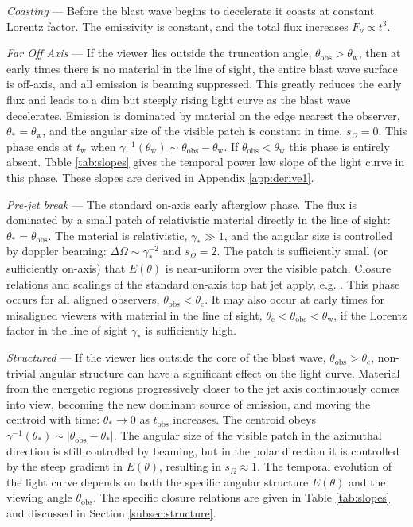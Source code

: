 \documentclass[twocolumn]{aastex62}
\newcommand{\tobs}{\ensuremath{t_{\mathrm{obs}}}}
\newcommand{\tW}{\ensuremath{t_{\mathrm{w}}}}
\newcommand{\thobs}{\ensuremath{\theta_{\mathrm{obs}}}}
\newcommand{\thW}{\ensuremath{\theta_{\mathrm{w}}}}
\newcommand{\thC}{\ensuremath{\theta_{\mathrm{c}}}}
\newcommand{\som}{\ensuremath{s_{\Omega}}}
\begin{document}
\emph{Coasting} --- Before the blast wave begins to decelerate it coasts at constant Lorentz factor. The emissivity is constant, and the total flux increases $F_\nu \propto t^3$.

\emph{Far Off Axis} --- If the viewer lies outside the truncation angle, $\thobs > \thW$, then at early times there is no material in the line of sight, the entire blast wave surface is off-axis, and all emission is beaming suppressed.  This greatly reduces the early flux and leads to a dim but steeply rising light curve as the blast wave decelerates.  Emission is dominated by material on the edge nearest the observer, $\theta_* = \thW$, and the angular size of the visible patch is constant in time, $\som = 0$.  This phase ends at $\tW$ when $\gamma^{-1}(\thW) \sim \thobs-\thW$.  If $\thobs < \thW$ this phase is entirely absent.  Table \ref{tab:slopes} gives the temporal power law slope of the light curve in this phase.  These slopes are derived in Appendix \ref{app:derive1}.

\emph{Pre-jet break} --- The standard on-axis early afterglow phase.  The flux is dominated by a small patch of relativistic material directly in the line of sight: $\theta_* = \thobs$.  The material is relativistic, $\gamma_* \gg 1$, and the angular size is controlled by doppler beaming: $\Delta \Omega \sim \gamma_*^{-2}$ and $\som = 2$.  The patch is sufficiently small (or sufficiently on-axis) that $E(\theta)$ is near-uniform over the visible patch.  Closure relations and scalings of the standard on-axis top hat jet apply, e.g. \citet{Granot:2002aa}.  This phase occurs for all aligned observers, $\thobs < \thC$.  It may also occur at early times for misaligned viewers with material in the line of sight, $\thC < \thobs < \thW$, if the Lorentz factor in the line of sight $\gamma_*$ is sufficiently high.


\emph{Structured} --- If the viewer lies outside the core of the blast wave, $\thobs > \thC$, non-trivial angular structure can have a significant effect on the light curve.  Material from the energetic regions progressively closer to the jet axis continuously comes into view, becoming the new dominant source of emission, and moving the centroid with time: $\theta_* \to 0$ as $\tobs$ increases.  The centroid obeys $\gamma^{-1}(\theta_*) \sim |\thobs-\theta_*|$.  The angular size of the visible patch in the azimuthal direction is still controlled by beaming, but in the polar direction it is controlled by the steep gradient in $E(\theta)$, resulting in $\som \approx 1$.  The temporal evolution of the light curve depends on both the specific angular structure $E(\theta)$ and the viewing angle $\thobs$. The specific closure relations are given in Table \ref{tab:slopes} and discussed in Section \ref{subsec:structure}.
\end{document}
